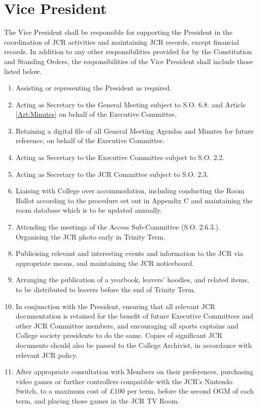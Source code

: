 \section{Vice President}
\npara The Vice President shall be responsible for supporting the President in the coordination of JCR activities and maintaining JCR records, except financial records.
\npara In addition to any other responsibilities provided for by the Constitution and Standing Orders, the responsibilities of the Vice President shall include those listed below.
\begin{enumerate}
    \item Assisting or representing the President as required.
    \item Acting as Secretary to the General Meeting subject to S.O. 6.8. and Article \ref{Art:Minutes} on behalf of the Executive Committee.
    \item Retaining a digital file of all General Meeting Agendas and Minutes for future reference, on behalf of the Executive Committee.
    \item Acting as Secretary to the Executive Committee subject to S.O. 2.2.
    \item Acting as Secretary to the JCR Committee subject to S.O. 2.3.
    \item Liaising with College over accommodation, including conducting the Room Ballot according to the procedure set out in Appendix C and maintaining the room database which is to be updated annually.
    \item Attending the meetings of the Access Sub-Committee (S.O. 2.6.3.). Organising the JCR photo early in Trinity Term.
    \item Publicising relevant and interesting events and information to the JCR via appropriate means, and maintaining the JCR noticeboard.
    \item Arranging the publication of a yearbook, leavers' hoodies, and related items, to be distributed to leavers before the end of Trinity Term.
    \item In conjunction with the President, ensuring that all relevant JCR documentation is retained for the benefit of future Executive Committees and other JCR Committee members, and encouraging all sports captains and College society presidents to do the same. Copies of significant JCR documents should also be passed to the College Archivist, in accordance with relevant JCR policy. 
    \item After appropriate consultation with Members on their preferences, purchasing video games or further controllers compatible with the JCR’s Nintendo Switch, to a maximum cost of £100 per term, before the second OGM of each term, and placing those games in the JCR TV Room.

\end{enumerate}

